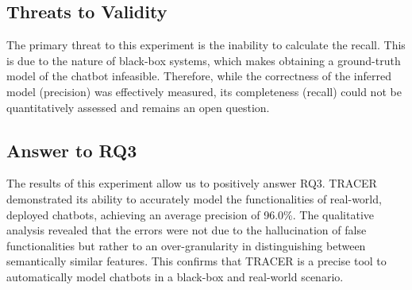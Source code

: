 \subsection{Threats to Validity}

The primary threat to this experiment is
the inability to calculate the recall.
This is due to the nature of black-box systems,
which makes obtaining a ground-truth model of the chatbot infeasible.
Therefore, while the correctness of the inferred model (precision)
was effectively measured,
its completeness (recall)
could not be quantitatively assessed and remains an open question.

\subsection{Answer to RQ3}

The results of this experiment allow us to positively answer RQ3.
\ac{TRACER} demonstrated its ability
to accurately model the functionalities of
real-world, deployed chatbots, achieving an average precision of 96.0\%.
The qualitative analysis revealed that
the errors were not due to the hallucination of false functionalities
but rather to an over-granularity in distinguishing
between semantically similar features.
This confirms that \ac{TRACER} is a precise tool
to automatically model chatbots
in a black-box and real-world scenario.
